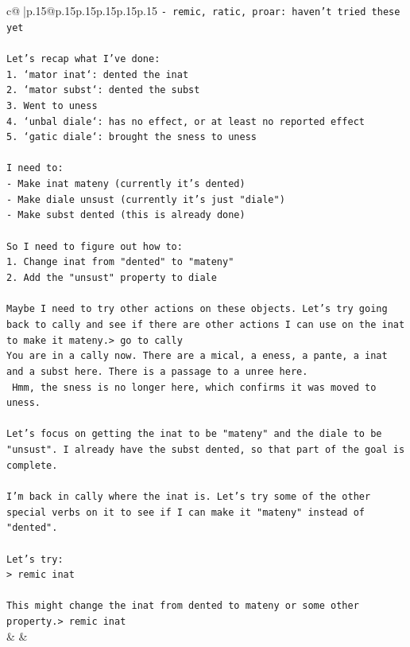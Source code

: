 \documentclass{article}
\begin{document}
{\begin{supertabular}{c@{$\;$}|p{.15\linewidth}@{}p{.15\linewidth}p{.15\linewidth}p{.15\linewidth}p{.15\linewidth}p{.15\linewidth}}
{{{\texttt{{-} remic, ratic, proar: haven't tried these yet} \\
\\ 
\texttt{Let's recap what I've done:} \\
\texttt{1. `mator inat`: dented the inat} \\
\texttt{2. `mator subst`: dented the subst} \\
\texttt{3. Went to uness} \\
\texttt{4. `unbal diale`: has no effect, or at least no reported effect} \\
\texttt{5. `gatic diale`: brought the sness to uness} \\
\\ 
\texttt{I need to:} \\
\texttt{{-} Make inat mateny (currently it's dented)} \\
\texttt{{-} Make diale unsust (currently it's just "diale")} \\
\texttt{{-} Make subst dented (this is already done)} \\
\\ 
\texttt{So I need to figure out how to:} \\
\texttt{1. Change inat from "dented" to "mateny"} \\
\texttt{2. Add the "unsust" property to diale} \\
\\ 
\texttt{Maybe I need to try other actions on these objects. Let's try going back to cally and see if there are other actions I can use on the inat to make it mateny.> go to cally} \\
\texttt{You are in a cally now. There are a mical, a eness, a pante, a inat and a subst here. There is a passage to a unree here.} \\
\texttt{ Hmm, the sness is no longer here, which confirms it was moved to uness. } \\
\\ 
\texttt{Let's focus on getting the inat to be "mateny" and the diale to be "unsust". I already have the subst dented, so that part of the goal is complete.} \\
\\ 
\texttt{I'm back in cally where the inat is. Let's try some of the other special verbs on it to see if I can make it "mateny" instead of "dented".} \\
\\ 
\texttt{Let's try:} \\
\texttt{> remic inat} \\
\\ 
\texttt{This might change the inat from dented to mateny or some other property.> remic inat} \\
            }
        }
    }
    & & \\ \\


\end{supertabular}}
\end{document}

